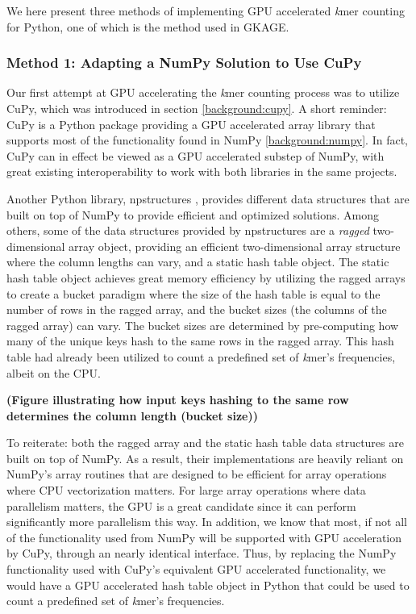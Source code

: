 We here present three methods of implementing GPU accelerated \textit{k}mer counting for Python, one of which is the method used in GKAGE.

\subsubsection{Method 1: Adapting a NumPy Solution to Use CuPy} \label{methods:gpu_accelerating_kmer_counting:method1}
Our first attempt at GPU accelerating the \textit{k}mer counting process was to utilize CuPy, which was introduced in section \ref{background:cupy}.
A short reminder: CuPy is a Python package providing a GPU accelerated array library that supports most of the functionality found in NumPy \ref{background:numpy}.
In fact, CuPy can in effect be viewed as a GPU accelerated substep of NumPy, with great existing interoperability to work with both libraries in the same projects.

Another Python library, npstructures \cite{npstructures}, provides different data structures that are built on top of NumPy to provide efficient and optimized solutions.
Among others, some of the data structures provided by npstructures are a \textit{ragged} two-dimensional array object, providing an efficient two-dimensional array structure where the column lengths can vary, and a static hash table object.
The static hash table object achieves great memory efficiency by utilizing the ragged arrays to create a bucket paradigm where the size of the hash table is equal to the number of rows in the ragged array, and the bucket sizes (the columns of the ragged array) can vary.
The bucket sizes are determined by pre-computing how many of the unique keys hash to the same rows in the ragged array.
This hash table had already been utilized to count a predefined set of \textit{k}mer's frequencies, albeit on the CPU.

\textbf{(Figure illustrating how input keys hashing to the same row determines the column length (bucket size))}

To reiterate: both the ragged array and the static hash table data structures are built on top of NumPy.
As a result, their implementations are heavily reliant on NumPy's array routines that are designed to be efficient for array operations where CPU vectorization matters. 
For large array operations where data parallelism matters, the GPU is a great candidate since it can perform significantly more parallelism this way.
In addition, we know that most, if not all of the functionality used from NumPy will be supported with GPU acceleration by CuPy, through an nearly identical interface.
Thus, by replacing the NumPy functionality used with CuPy's equivalent GPU accelerated functionality, we would have a GPU accelerated hash table object in Python that could be used to count a predefined set of \textit{k}mer's frequencies.

